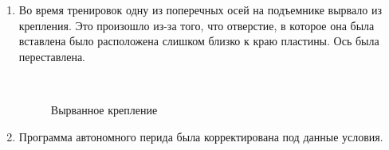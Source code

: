 \begin{enumerate}
	\item Во время тренировок одну из поперечных осей на подъемнике вырвало из крепления. Это произошло из-за того, что отверстие, в которое она была вставлена было расположена слишком близко к краю пластины. Ось была переставлена.
	\begin{figure}[H]
		\begin{minipage}[h]{0.2\linewidth}
			\center  
		\end{minipage}
		\begin{minipage}[h]{0.6\linewidth}
			\caption{Вырванное крепление}
		\end{minipage}
	\end{figure}
	
	\item Программа автономного перида была корректирована под данные условия.
	
\end{enumerate}
\fillpage